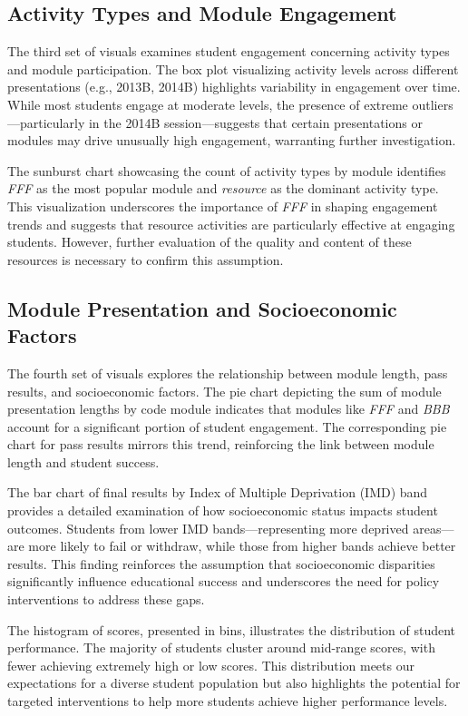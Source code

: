 \subsection*{Activity Types and Module Engagement}

The third set of visuals examines student engagement concerning activity types and module participation. The box plot visualizing activity levels across different presentations (e.g., 2013B, 2014B) highlights variability in engagement over time. While most students engage at moderate levels, the presence of extreme outliers—particularly in the 2014B session—suggests that certain presentations or modules may drive unusually high engagement, warranting further investigation.

The sunburst chart showcasing the count of activity types by module identifies \textit{FFF} as the most popular module and \textit{resource} as the dominant activity type. This visualization underscores the importance of \textit{FFF} in shaping engagement trends and suggests that resource activities are particularly effective at engaging students. However, further evaluation of the quality and content of these resources is necessary to confirm this assumption.

\subsection*{Module Presentation and Socioeconomic Factors}

The fourth set of visuals explores the relationship between module length, pass results, and socioeconomic factors. The pie chart depicting the sum of module presentation lengths by code module indicates that modules like \textit{FFF} and \textit{BBB} account for a significant portion of student engagement. The corresponding pie chart for pass results mirrors this trend, reinforcing the link between module length and student success.

The bar chart of final results by Index of Multiple Deprivation (IMD) band provides a detailed examination of how socioeconomic status impacts student outcomes. Students from lower IMD bands—representing more deprived areas—are more likely to fail or withdraw, while those from higher bands achieve better results. This finding reinforces the assumption that socioeconomic disparities significantly influence educational success and underscores the need for policy interventions to address these gaps.

The histogram of scores, presented in bins, illustrates the distribution of student performance. The majority of students cluster around mid-range scores, with fewer achieving extremely high or low scores. This distribution meets our expectations for a diverse student population but also highlights the potential for targeted interventions to help more students achieve higher performance levels.

